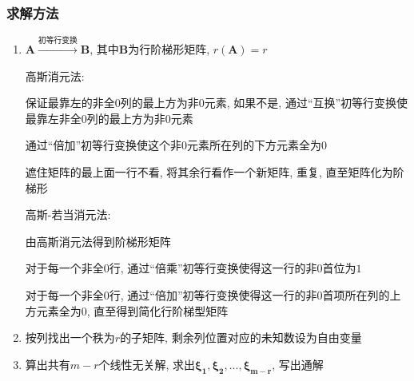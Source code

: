 \subsubsection{求解方法}
\begin{enumerate}
\item $ \bm{A}\xrightarrow{\text{初等行变换}}\bm{B} $, 其中$ \bm{B} $为行阶梯形矩阵, $ r(\bm{A})=r $\par
高斯消元法: \par
{} 保证最靠左的非全$ 0 $列的最上方为非$ 0 $元素, 如果不是, 通过``互换''初等行变换使最靠左非全$ 0 $列的最上方为非$ 0 $元素\par
{} 通过``倍加''初等行变换使这个非$ 0 $元素所在列的下方元素全为$ 0 $\par
{} 遮住矩阵的最上面一行不看, 将其余行看作一个新矩阵, 重复, 直至矩阵化为阶梯形\par
高斯-若当消元法:\par
{} 由高斯消元法得到阶梯形矩阵\par
{} 对于每一个非全$ 0 $行, 通过``倍乘''初等行变换使得这一行的非$ 0 $首位为$ 1 $\par
{} 对于每一个非全$ 0 $行, 通过``倍加''初等行变换使得这一行的非$ 0 $首项所在列的上方元素全为$ 0 $, 直至得到简化行阶梯型矩阵
\item 按列找出一个秩为$ r $的子矩阵, 剩余列位置对应的未知数设为自由变量
\item 算出共有$ m-r $个线性无关解, 求出$ \bm{\xi_{1}},\bm{\xi_{2}},...,\bm{\xi_{m-r}} $, 写出通解
\end{enumerate}

